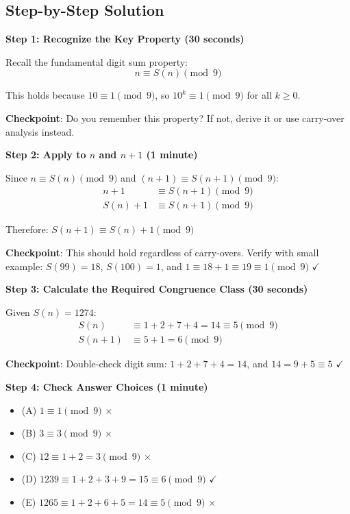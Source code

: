 \documentclass[]{article}
\begin{document}
\begin{solutionbox}
\subsection*{Step-by-Step Solution}

\textbf{Step 1: Recognize the Key Property (30 seconds)}

Recall the fundamental digit sum property:
\[n \equiv S(n) \pmod{9}\]

This holds because $10 \equiv 1 \pmod{9}$, so $10^k \equiv 1 \pmod{9}$ for all $k \geq 0$.

\textbf{Checkpoint}: Do you remember this property? If not, derive it or use carry-over analysis instead.

\textbf{Step 2: Apply to $n$ and $n+1$ (1 minute)}

Since $n \equiv S(n) \pmod{9}$ and $(n+1) \equiv S(n+1) \pmod{9}$:
\begin{align*}
n+1 &\equiv S(n+1) \pmod{9} \\
S(n) + 1 &\equiv S(n+1) \pmod{9}
\end{align*}

Therefore: $S(n+1) \equiv S(n) + 1 \pmod{9}$

\textbf{Checkpoint}: This should hold regardless of carry-overs. Verify with small example: $S(99) = 18$, $S(100) = 1$, and $1 \equiv 18+1 \equiv 19 \equiv 1 \pmod{9}$ $\checkmark$

\textbf{Step 3: Calculate the Required Congruence Class (30 seconds)}

Given $S(n) = 1274$:
\begin{align*}
S(n) &\equiv 1 + 2 + 7 + 4 = 14 \equiv 5 \pmod{9} \\
S(n+1) &\equiv 5 + 1 = 6 \pmod{9}
\end{align*}

\textbf{Checkpoint}: Double-check digit sum: $1+2+7+4 = 14$, and $14 = 9 + 5 \equiv 5$ $\checkmark$

\textbf{Step 4: Check Answer Choices (1 minute)}

\begin{itemize}
    \item (A) $1 \equiv 1 \pmod{9}$ $\times$
    \item (B) $3 \equiv 3 \pmod{9}$ $\times$
    \item (C) $12 \equiv 1+2 = 3 \pmod{9}$ $\times$
    \item (D) $1239 \equiv 1+2+3+9 = 15 \equiv 6 \pmod{9}$ $\checkmark$
    \item (E) $1265 \equiv 1+2+6+5 = 14 \equiv 5 \pmod{9}$ $\times$
\end{itemize}


\end{solutionbox}
\end{document}
